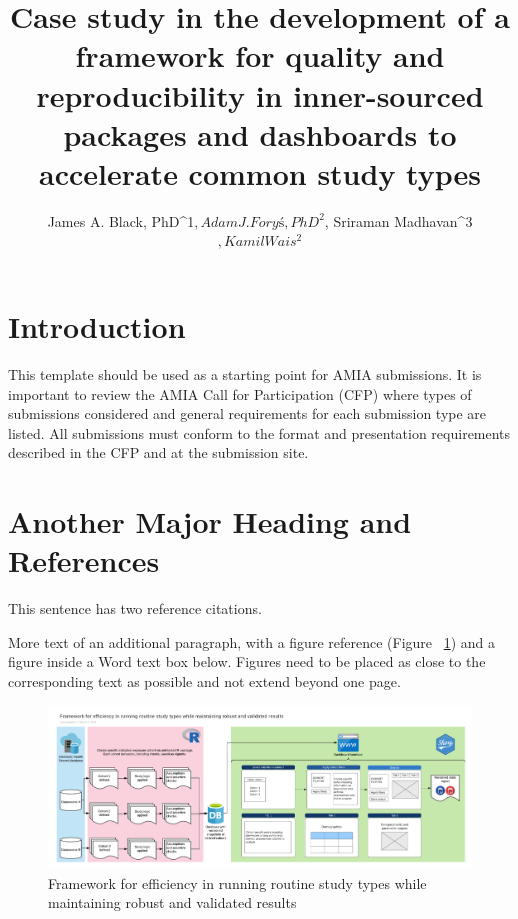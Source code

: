 \documentclass{amia}
\begin{document}
\title{Case study in the development of a framework for quality and reproducibility in inner-sourced packages and dashboards to accelerate common study types}

\author{James A. Black, PhD^{1}$, Adam J. Foryś, PhD^{2}$, Sriraman Madhavan^{3}$, Kamil Wais^{2}$}


\maketitle

\section*{Introduction}
This template should be used as a starting point for AMIA submissions.  
It is important to review the AMIA Call for Participation (CFP) where types of submissions considered and general requirements for each submission type are listed. All submissions must conform to the format and presentation requirements described in the CFP and at the submission site.


\section*{Another Major Heading and References}
This sentence has two reference citations\cite{ref1,ref2}.

More text of an additional paragraph, with a figure reference (Figure ~\ref{fig1}) and a figure inside a Word text box below.  Figures need to be placed as close to the corresponding text as possible and not extend beyond one page.\\
\begin{figure}[h!]
\centering
\includegraphics[width=\textwidth]{pics/abstract_image.png}
\caption{Framework for efficiency in running routine study types while maintaining robust and validated results}
\label{fig1}
\end{figure}
\end{document}
